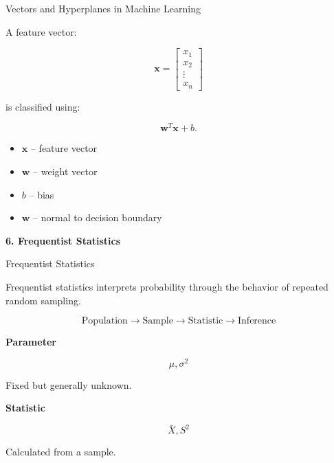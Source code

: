 \documentclass[aspectratio=169,11pt]{beamer}
\begin{document}
\begin{frame}{Vectors and Hyperplanes in Machine Learning}

A feature vector:

\[
\mathbf x=
\begin{bmatrix}
x_1\\x_2\\\vdots\\x_n
\end{bmatrix}
\]

is classified using:

\[
\mathbf w^T\mathbf x+b.
\]

\begin{itemize}
    \item $\mathbf x$ -- feature vector
    \item $\mathbf w$ -- weight vector
    \item $b$ -- bias
    \item $\mathbf w$ -- normal to decision boundary
\end{itemize}

\end{frame}


\begin{frame}
\centering
\vfill
{\Huge\color{CUSATblue}\textbf{6. Frequentist Statistics}}
\vfill
\end{frame}

\begin{frame}{Frequentist Statistics}

Frequentist statistics interprets probability through the behavior of repeated random sampling.

\begin{center}
\[
\boxed{
\text{Population}
\rightarrow
\text{Sample}
\rightarrow
\text{Statistic}
\rightarrow
\text{Inference}
}
\]
\end{center}

\textbf{Parameter}

\[
\mu,\sigma^2
\]

Fixed but generally unknown.

\textbf{Statistic}

\[
\bar X,S^2
\]

Calculated from a sample.

\end{frame}
\end{document}
